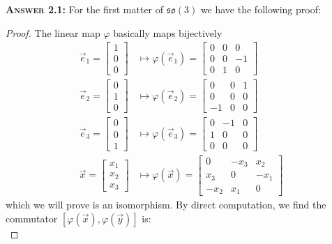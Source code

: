 \medbreak\noindent\textsc{\textbf{Answer 2.1:\enspace}}
For the first matter of $\mathfrak{so}(3)$ we have the following
proof:
\begin{proof}
The linear map $\varphi$ basically maps bijectively
\begin{subequations}
\begin{align}
\vec{e}_{1}=\begin{bmatrix}1\\0\\0\end{bmatrix}&\mapsto\varphi(\vec{e}_{1})=
\begin{bmatrix}0 & 0 &
  0\\0&0&-1\\0&1&0\end{bmatrix}\\
\vec{e}_{2}=\begin{bmatrix}0\\1\\0\end{bmatrix}&\mapsto\varphi(\vec{e}_{2})=
\begin{bmatrix}0 & 0 &
  1\\0&0&0\\-1&0&0\end{bmatrix}\\
\vec{e}_{3}=\begin{bmatrix}0\\0\\1\end{bmatrix}&\mapsto\varphi(\vec{e}_{3})=
\begin{bmatrix}0 & -1 &
  0\\1&0&0\\0&0&0\end{bmatrix}\\
\vec{x}=\begin{bmatrix}x_{1}\\x_{2}\\x_{3}\end{bmatrix}
&\mapsto \varphi(\vec{x})=\begin{bmatrix}0 & -x_{3} &
  x_{2}\\x_{3}&0&-x_{1}\\-x_{2}&x_{1}&0\end{bmatrix}
\end{align}
\end{subequations}
which we will prove is an isomorphism.
By direct computation, we find the commutator
$[\varphi(\vec{x}),\varphi(\vec{y})]$ is:
\begin{subequations}

\end{subequations}
\end{proof}
